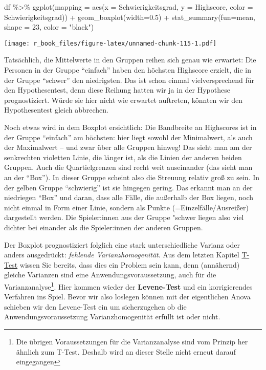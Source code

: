 \documentclass[
]{book}
\newenvironment{Shaded}{\begin{snugshade}}{\end{snugshade}}
\newcommand{\AttributeTok}[1]{\textcolor[rgb]{0.77,0.63,0.00}{#1}}
\newcommand{\DecValTok}[1]{\textcolor[rgb]{0.00,0.00,0.81}{#1}}
\newcommand{\FloatTok}[1]{\textcolor[rgb]{0.00,0.00,0.81}{#1}}
\newcommand{\FunctionTok}[1]{\textcolor[rgb]{0.00,0.00,0.00}{#1}}
\newcommand{\NormalTok}[1]{#1}
\newcommand{\SpecialCharTok}[1]{\textcolor[rgb]{0.00,0.00,0.00}{#1}}
\newcommand{\StringTok}[1]{\textcolor[rgb]{0.31,0.60,0.02}{#1}}
\begin{document}
\begin{Shaded}
\begin{Highlighting}[]
\NormalTok{df }\SpecialCharTok{\%\textgreater{}\%} 
  \FunctionTok{ggplot}\NormalTok{(}\AttributeTok{mapping =} \FunctionTok{aes}\NormalTok{(}\AttributeTok{x =}\NormalTok{ Schwierigkeitsgrad, }
                       \AttributeTok{y =}\NormalTok{ Highscore, }
                       \AttributeTok{color =}\NormalTok{ Schwierigkeitsgrad)) }\SpecialCharTok{+}
  \FunctionTok{geom\_boxplot}\NormalTok{(}\AttributeTok{width=}\FloatTok{0.5}\NormalTok{) }\SpecialCharTok{+}
  \FunctionTok{stat\_summary}\NormalTok{(}\AttributeTok{fun=}\NormalTok{mean, }\AttributeTok{shape =} \DecValTok{23}\NormalTok{, }\AttributeTok{color =} \StringTok{"black"}\NormalTok{)}
\end{Highlighting}
\end{Shaded}

\texttt{[image: r\_book\_files/figure-latex/unnamed-chunk-115-1.pdf]}

Tatsächlich, die Mittelwerte in den Gruppen reihen sich genau wie erwartet: Die Personen in der Gruppe ``einfach'' haben den höchsten Highscore erzielt, die in der Gruppe ``schwer'' den niedrigsten. Das ist schon einmal vielversprechend für den Hypothesentest, denn diese Reihung hatten wir ja in der Hypothese prognostiziert. Würde sie hier nicht wie erwartet auftreten, könnten wir den Hypothesentest gleich abbrechen.

Noch etwas wird in dem Boxplot ersichtlich: Die Bandbreite an Highscores ist in der Gruppe ``einfach'' am höchsten: hier liegt sowohl der Minimalwert, als auch der Maximalwert -- und zwar über alle Gruppen hinweg! Das sieht man am der senkrechten violetten Linie, die länger ist, als die Linien der anderen beiden Gruppen. Auch die Quartielgrenzen sind recht weit auseinander (das sieht man an der ``Box''). In dieser Gruppe scheint also die Streuung relativ groß zu sein. In der gelben Gruppe ``schwierig'' ist sie hingegen gering. Das erkannt man an der niedriegen ``Box'' und daran, dass alle Fälle, die außerhalb der Box liegen, noch nicht einmal in Form einer Linie, sondern als Punkte (=Einzelfälle/Ausreißer) dargestellt werden. Die Spieler:innen aus der Gruppe "schwer liegen also viel dichter bei einander als die Spieler:innen der anderen Gruppen.

Der Boxplot prognostiziert folglich eine stark unterschiedliche Varianz oder anders ausgedrückt: \emph{fehlende Varianzhomogenität}. Aus dem letzten Kapitel \protect\hyperlink{anwendungsvoraussetzungen}{T-Test} wissen Sie bereits, dass dies ein Problem sein kann, denn (annähernd) gleiche Varianzen sind eine Anwendungsvoraussetzung, auch für die Varianzanalyse\footnote{Die übrigen Voraussetzungen für die Varianzanalyse sind vom Prinzip her ähnlich zum T-Test. Deshalb wird an dieser Stelle nicht erneut darauf eingegangen}. Hier kommen wieder der \textbf{Levene-Test} und ein korrigierendes Verfahren ins Spiel. Bevor wir also loslegen können mit der eigentlichen Anova schieben wir den Levene-Test ein um sicherzugehen ob die Anwendungsvoraussetzung Varianzhomogenität erfüllt ist oder nicht.
\end{document}
